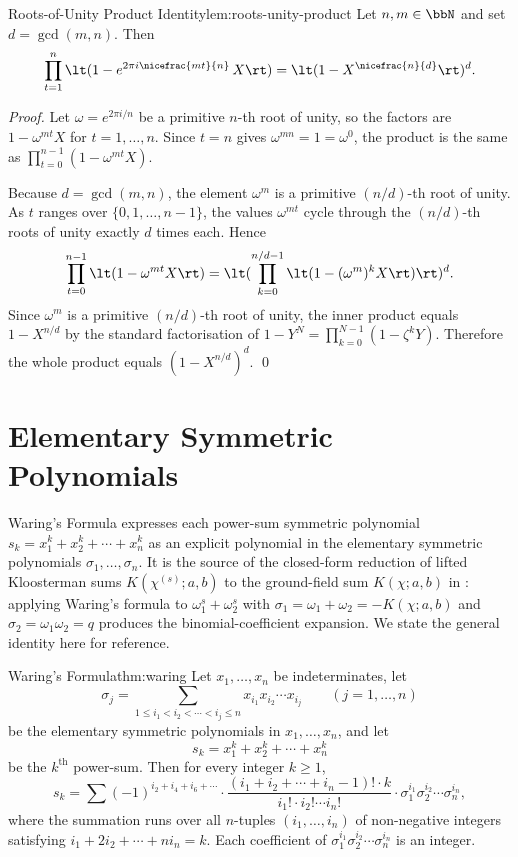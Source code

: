 \begin{lemma}{Roots-of-Unity Product Identity}{lem:roots-unity-product}
  Let $n,m\in\bbN$ and set $d=\gcd(m,n)$. Then
  $$\prod_{t=1}^{n}\lt(1-e^{2\pi i\nicefrac{mt}{n}}\,X\rt)=\lt(1-X^{\nicefrac{n}{d}}\rt)^{d}.$$
\end{lemma}
\begin{proof}
  Let $\omega=e^{2\pi i/n}$ be a primitive $n$-th root of unity, so the factors are $1-\omega^{mt}X$ for $t=1,\dots,n$. Since $t=n$ gives $\omega^{mn}=1=\omega^0$, the product is the same as $\prod_{t=0}^{n-1}(1-\omega^{mt}X)$.

  Because $d=\gcd(m,n)$, the element $\omega^m$ is a primitive $(n/d)$-th root of unity. As $t$ ranges over $\{0,1,\dots,n-1\}$, the values $\omega^{mt}$ cycle through the $(n/d)$-th roots of unity exactly $d$ times each. Hence
  $$\prod_{t=0}^{n-1}\lt(1-\omega^{mt}X\rt)=\lt(\prod_{k=0}^{n/d-1}\lt(1-(\omega^m)^k X\rt)\rt)^d.$$
  Since $\omega^m$ is a primitive $(n/d)$-th root of unity, the inner product equals $1-X^{n/d}$ by the standard factorisation of $1-Y^N = \prod_{k=0}^{N-1}(1-\zeta^k Y)$. Therefore the whole product equals $(1-X^{n/d})^d$. \qed
\end{proof}

\section{Elementary Symmetric Polynomials}
Waring's Formula expresses each power-sum symmetric polynomial $s_k=x_1^k+x_2^k+\cdots+x_n^k$ as an explicit polynomial in the elementary symmetric polynomials $\sigma_1,\dots,\sigma_n$. It is the source of the closed-form reduction of lifted Kloosterman sums $K(\chi^{(s)};a,b)$ to the ground-field sum $K(\chi;a,b)$ in : applying Waring's formula to $\omega_1^s+\omega_2^s$ with $\sigma_1=\omega_1+\omega_2=-K(\chi;a,b)$ and $\sigma_2=\omega_1\omega_2=q$ produces the binomial-coefficient expansion. We state the general identity here for reference.
\begin{Theorem}{Waring's Formula}{thm:waring}%
  Let $x_1,\dots,x_n$ be indeterminates, let $$\sigma_j=\sum_{1\leq i_1<i_2<\cdots<i_j\leq n}x_{i_1}x_{i_2}\cdots x_{i_j}\qquad (j=1,\dots,n)$$ be the elementary symmetric polynomials in $x_1,\dots,x_n$, and let $$s_k=x_1^k+x_2^k+\cdots+x_n^k$$ be the $k^{\text{th}}$ power-sum. Then for every integer $k\geq 1$,
  $$s_k=\sum(-1)^{i_2+i_4+i_6+\cdots}\cdot \frac{(i_1+i_2+\cdots+i_n-1)!\cdot k}{i_1!\cdot i_2!\cdots i_n!}\cdot \sigma_1^{i_1}\sigma_2^{i_2}\cdots \sigma_n^{i_n},$$
  where the summation runs over all $n$-tuples $(i_1,\dots,i_n)$ of non-negative integers satisfying $i_1+2i_2+\cdots+ni_n=k$. Each coefficient of $\sigma_1^{i_1}\sigma_2^{i_2}\cdots \sigma_n^{i_n}$ is an integer.
\end{Theorem}

